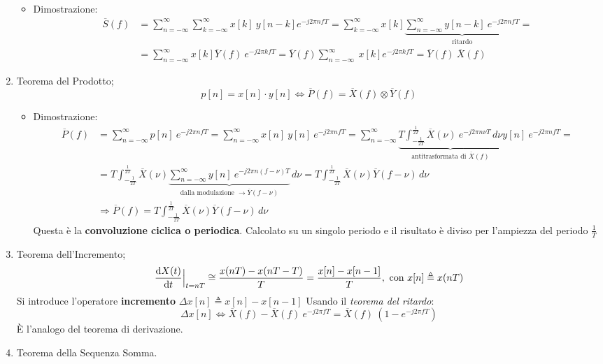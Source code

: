 \documentclass[
]{article}
\providecommand{\tightlist}{%
  \setlength{\itemsep}{0pt}\setlength{\parskip}{0pt}}
\begin{document}
\begin{enumerate}
  \begin{itemize}
  \tightlist
  \item
    Dimostrazione: \begin{align*}
     \overline{S}(f) &= \sum_{n=-\infty}^{\infty} \sum_{k=-\infty}^{\infty} x[k]\ y[n-k] e^{-j2\pi nfT} = \sum_{k=-\infty}^{\infty} x[k] \underbrace{\sum_{n=-\infty}^{\infty}y[n-k]\ e^{-j2\pi nfT}}_{\text{ritardo}}= \\
     &= \sum_{n=-\infty}^{\infty} x[k] \overline{Y}(f) \ e^{-j2\pi kfT} = \overline{Y}(f)  \sum_{n=-\infty}^{\infty} \ x[k]  e^{-j2\pi kfT} =\overline{Y}(f) \ \overline{X}(f)
     \end{align*}
  \end{itemize}
\item
  Teorema del Prodotto; \[
   p[n]=x[n]\cdot y[n] \Longleftrightarrow \overline{P}(f) = \overline{X}(f) \otimes \overline{Y}(f)
   \]

  \begin{itemize}
  \tightlist
  \item
    Dimostrazione: \begin{align*}
      \overline{P}(f)&=\sum_{n=-\infty}^{\infty} p[n] \ e^{-j2\pi nfT} =  \sum_{n=-\infty}^{\infty} x[n] \ y[n] \ e^{-j2\pi nfT} = \sum_{n=-\infty}^{\infty}
      \underbrace{T\int_{-\frac{1}{2T}}^{\frac{1}{2T}} \overline{X}(\nu)\ e^{-j2\pi n\nu T} \,d\nu}_{\text{antitrasformata di }\overline{X}(f)} y[n] \ e^{-j2\pi nfT} = \\
      &= T \int_{-\frac{1}{2T}}^{\frac{1}{2T}} \overline{X}(\nu)  \underbrace{\sum_{n=-\infty}^{\infty} y[n] \ e^{-j2\pi n(f-\nu)T}}_{\text{dalla modulazione }\to \overline{Y}(f-\nu)} \,d\nu=
      T \int_{-\frac{1}{2T}}^{\frac{1}{2T}} \overline{X}(\nu) \overline{Y}(f-\nu)\,d\nu  \\
     &\Rightarrow \overline{P}(f) = T \int_{-\frac{1}{2T}}^{\frac{1}{2T}} \overline{X}(\nu) \overline{Y}(f-\nu)\,d\nu
     \end{align*} Questa è la \textbf{convoluzione ciclica o periodica}.
    Calcolato su un singolo periodo e il risultato è diviso per
    l'ampiezza del periodo \(\frac{1}{T}\)
  \end{itemize}
\item
  Teorema dell'Incremento; \[
   \odv{X(t)}{t}\Big|_{t=nT} \cong \frac{x(nT)-x(nT-T)}{T} = \frac{x[n]-x[n-1]}{T}, \text{ con } x[n] \triangleq x(nT)  
   \] Si introduce l'operatore \textbf{incremento}
  \(\Delta x[n] \triangleq x[n] - x[n-1]\) \newline Usando il
  \emph{teorema del ritardo}: \[
   \Delta x[n] \Longleftrightarrow \overline{X}(f) - \overline{X}(f)\ e^{-j2\pi fT} = \overline{X}(f) \ (1-e^{-j2\pi fT})
   \] È l'analogo del teorema di derivazione.
\item
  Teorema della Sequenza Somma.


\end{enumerate}
\end{document}

